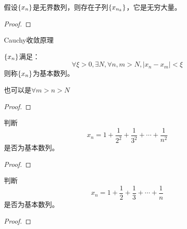 \documentclass[lang=cn]{elegantbook}
\begin{document}
\begin{theorem}
    假设$\left\{ x_n\right\}$是无界数列，则存在子列$\left\{ x_{n_k}\right\}$，它是无穷大量。
\end{theorem}
\begin{proof}
    
\end{proof}

Cauchy收敛原理

\begin{definition}
    $\left\{ x_n\right\}$满足：
    \[\forall \xi > 0, \exists N, \forall n, m > N, \left|x_n - x_m\right| < \xi \]
    则称$\left\{ x_n\right\}$为基本数列。
\end{definition}
也可以是$\forall m > n > N$
\begin{proof}
\end{proof}

\begin{proposition}
    判断
    \[ x_n = 1 + \frac{1}{2^2} + \frac{1}{3^2} + \cdots + \frac{1}{n^2} \]
    是否为基本数列。
\end{proposition}
\begin{proof}

\end{proof}

\begin{proposition}
    判断
    \[ x_n = 1 + \frac{1}{2} + \frac{1}{3} + \cdots + \frac{1}{n} \]
    是否为基本数列。
\end{proposition}
\begin{proof}

\end{proof}
\end{document}
